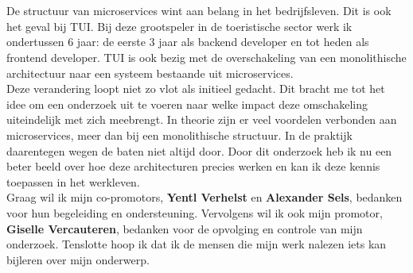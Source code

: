 
\chapter*{}
\label{ch:voorwoord}


De structuur van microservices wint aan belang in het bedrijfsleven. Dit is ook het geval bij TUI.
Bij deze grootspeler in de toeristische sector werk ik ondertussen 6 jaar: de eerste 3 jaar als backend developer en tot heden als frontend developer. TUI is ook bezig met de overschakeling van een monolithische architectuur naar een systeem bestaande uit microservices.\\
Deze verandering loopt niet zo vlot als initieel gedacht. Dit bracht me tot het idee om een onderzoek uit te voeren naar welke impact deze omschakeling uiteindelijk met zich meebrengt. In theorie zijn er veel voordelen verbonden aan microservices, meer dan bij een monolithische structuur. In de praktijk daarentegen wegen de baten niet altijd door. Door dit onderzoek heb ik nu een beter beeld over hoe deze architecturen precies werken en kan ik deze kennis toepassen in het werkleven.\\  
Graag wil ik mijn co-promotors, \textbf{Yentl Verhelst} en \textbf{Alexander Sels}, bedanken voor hun begeleiding en ondersteuning. Vervolgens wil ik ook mijn promotor, \textbf{Giselle Vercauteren}, bedanken voor de opvolging en controle van mijn onderzoek. Tenslotte hoop ik dat ik de mensen die mijn werk nalezen iets kan bijleren over mijn onderwerp.
